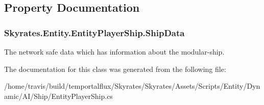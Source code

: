 \subsection{Property Documentation}
\hypertarget{class_skyrates_1_1_entity_1_1_entity_player_ship_af6c72c799869168d507cec7914ed0ccc}{
\subsubsection[{Ship\-Data}]{ Skyrates.\-Entity.\-Entity\-Player\-Ship.\-Ship\-Data\hspace{0.3cm}{\ttfamily [get]}}}\label{class_skyrates_1_1_entity_1_1_entity_player_ship_af6c72c799869168d507cec7914ed0ccc}


The network safe data which has information about the modular-\/ship. 



The documentation for this class was generated from the following file\-:\begin{DoxyCompactItemize}
\item 
/home/travis/build/temportalflux/\-Skyrates/\-Skyrates/\-Assets/\-Scripts/\-Entity/\-Dynamic/\-A\-I/\-Ship/Entity\-Player\-Ship.\-cs\end{DoxyCompactItemize}
